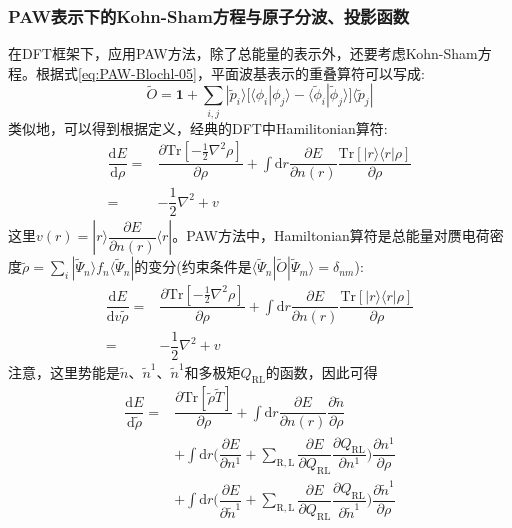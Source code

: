 \subsubsection{PAW表示下的Kohn-Sham方程与原子分波、投影函数}
在\textrm{DFT}框架下，应用\textrm{PAW}方法，除了总能量的表示外，还要考虑\textrm{Kohn-Sham}方程。根据式\eqref{eq:PAW-Blochl-05}，平面波基表示的重叠算符可以写成:
\begin{equation}
	\tilde O=\mathbf{1}+\sum_{i,j}|\tilde p_i\rangle\bigg[\langle\phi_i|\phi_j\rangle-\langle\tilde\phi_i|\tilde\phi_j\rangle\bigg]\langle\tilde p_j|
	\label{eq:PAW-Blochl-14}
\end{equation}
类似地，可以得到根据定义，经典的\textrm{DFT}中\textrm{Hamilitonian}算符:%
\begin{equation}
	\begin{aligned}
		\dfrac{\mathrm{d}E}{\mathrm{d}\rho}=&\dfrac{\partial\mathrm{Tr}[-\frac12\nabla^2\rho]}{\partial\rho}+\int\mathrm{d}r\dfrac{\partial E}{\partial n(r)}\dfrac{\mathrm{Tr}[|r\rangle\langle r|\rho]}{\partial\rho}\\
		=&-\dfrac12\nabla^2+v
	\end{aligned}
	\label{eq:PAW-DFT-H}
\end{equation}
这里$v(r)=|r\rangle\dfrac{\partial E}{\partial n(r)}\langle r|$。\textrm{PAW}方法中，\textrm{Hamiltonian}算符是总能量对赝电荷密度$\tilde\rho=\sum\limits_i|\tilde\Psi_n\rangle f_n\langle\tilde\Psi_n|$的变分(约束条件是$\langle\tilde\Psi_n|\tilde O|\tilde\Psi_m\rangle=\delta_{nm}$):
\begin{equation}
	\begin{aligned}
		\dfrac{\mathrm{d}E}{\mathrm{d}v\tilde\rho}=&\dfrac{\partial\mathrm{Tr}[-\frac12\nabla^2\rho]}{\partial\rho}+\int\mathrm{d}r\dfrac{\partial E}{\partial n(r)}\dfrac{\mathrm{Tr}[|r\rangle\langle r|\rho]}{\partial\rho}\\
		=&-\dfrac12\nabla^2+v
	\end{aligned}
	\label{eq:PAW-Blochl-H}
\end{equation}
注意，这里势能是$\tilde n$、$\tilde n^1$、$\tilde n^1$和多极矩$Q_{\mathrm{RL}}$的函数，因此可得
\begin{equation}
	\begin{aligned}
		\dfrac{\mathrm{d}E}{\mathrm{d}\tilde\rho}=&\dfrac{\partial\mathrm{Tr}[\tilde\rho\tilde T]}{\partial\rho}+\int\mathrm{d}r\dfrac{\partial E}{\partial n(r)}\dfrac{\partial\tilde n}{\partial\rho}\\
		&+\int\mathrm{d}r\bigg(\dfrac{\partial E}{\partial n^1}+\sum_{\mathrm{R,L}}\dfrac{\partial E}{\partial Q_{\mathrm{RL}}}\dfrac{\partial Q_{\mathrm{RL}}}{\partial n^1}\bigg)\dfrac{\partial n^1}{\partial\rho}\\
		&+\int\mathrm{d}r\bigg(\dfrac{\partial E}{\partial\tilde n^1}+\sum_{\mathrm{R,L}}\dfrac{\partial E}{\partial Q_{\mathrm{RL}}}\dfrac{\partial Q_{\mathrm{RL}}}{\partial\tilde n^1}\bigg)\dfrac{\partial\tilde n^1}{\partial\rho} 
	\end{aligned}
	\label{eq:PAW-Blochl-H-n}
\end{equation}
